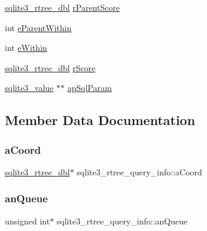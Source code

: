 \begin{DoxyCompactItemize}
\item 
\mbox{\hyperlink{sqlite3_8h_ae9156ff58620c1ceae9391f1afabae1b}{sqlite3\+\_\+rtree\+\_\+dbl}} \mbox{\hyperlink{structsqlite3__rtree__query__info_af7da93e7fc405eec7e7ec90ab237eab2}{r\+Parent\+Score}}
\item 
int \mbox{\hyperlink{structsqlite3__rtree__query__info_a8bd37c6af5427c35830f674a4db682c3}{e\+Parent\+Within}}
\item 
int \mbox{\hyperlink{structsqlite3__rtree__query__info_ad1038309f7ea55472a7ff99bf4f9d514}{e\+Within}}
\item 
\mbox{\hyperlink{sqlite3_8h_ae9156ff58620c1ceae9391f1afabae1b}{sqlite3\+\_\+rtree\+\_\+dbl}} \mbox{\hyperlink{structsqlite3__rtree__query__info_af449e4a3607573d17b3d31c67b6e1584}{r\+Score}}
\item 
\mbox{\hyperlink{sqlite3_8h_ac2fa1ecdb2290d9af6010edbd1cbc83c}{sqlite3\+\_\+value}} $\ast$$\ast$ \mbox{\hyperlink{structsqlite3__rtree__query__info_a57ccb3cce45dd946e5184b5addeb0326}{ap\+Sql\+Param}}
\end{DoxyCompactItemize}


\subsection{Member Data Documentation}
\mbox{\label{structsqlite3__rtree__query__info_a9d6e605e62fcf49d57dfc0d192076542}} 
\subsubsection{\texorpdfstring{aCoord}{aCoord}}
{\footnotesize\ttfamily \mbox{\hyperlink{sqlite3_8h_ae9156ff58620c1ceae9391f1afabae1b}{sqlite3\+\_\+rtree\+\_\+dbl}}$\ast$ sqlite3\+\_\+rtree\+\_\+query\+\_\+info\+::a\+Coord}

\mbox{\label{structsqlite3__rtree__query__info_ace9f952557eb7b0e050d879ebb80905a}} 
\subsubsection{\texorpdfstring{anQueue}{anQueue}}
{\footnotesize\ttfamily unsigned int$\ast$ sqlite3\+\_\+rtree\+\_\+query\+\_\+info\+::an\+Queue}

